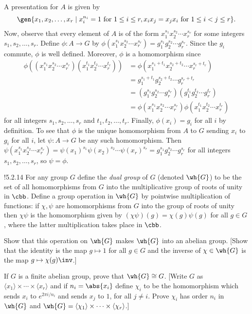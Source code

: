 \begin{sol}
    A presentation for $A$ is given by
    \[
    	\gen{x_1, x_2, \ldots, x_r \mid x_i^{n_i} = 1 \text{ for } 1 \leq i \leq r, x_ix_j = x_jx_i \text{ for } 1 \leq i < j \leq r}.
    \]
    Now, observe that every element of $A$ is of the form $x_1^{s_1} x_2^{s_2} \cdots x_r^{s_r}$ for some integers $s_1, s_2, \ldots, s_r$.
	Define $\phi \colon A \to G$ by $\phi(x_1^{s_1} x_2^{s_2} \cdots x_r^{s_r}) = g_1^{s_1} g_2^{s_2} \cdots g_r^{s_r}$.
	Since the $g_i$ commute, $\phi$ is well defined.
	Moreover, $\phi$ is a homomorphism since
    \begin{align*}
        \phi((x_1^{s_1} x_2^{s_2} \cdots x_r^{s_r})(x_1^{t_1} x_2^{t_2} \cdots x_r^{t_r})) & = \phi(x_1^{s_1 + t_1} x_2^{s_2 + t_2} \cdots x_r^{s_r + t_r}) \\
        & = g_1^{s_1 + t_1} g_2^{s_2 + t_2} \cdots g_r^{s_r + t_r} \\
        & = (g_1^{s_1} g_2^{s_2} \cdots g_r^{s_r})(g_1^{t_1} g_2^{t_2} \cdots g_r^{t_r}) \\
        & = \phi(x_1^{s_1} x_2^{s_2} \cdots x_r^{s_r})\phi(x_1^{t_1} x_2^{t_2} \cdots x_r^{t_r})
    \end{align*}
    for all integers $s_1, s_2, \ldots, s_r$ and $t_1, t_2, \ldots, t_r$.
	Finally, $\phi(x_i) = g_i$ for all $i$ by definition.
	To see that $\phi$ is the unique homomorphism from $A$ to $G$ sending $x_i$ to $g_i$ for all $i$, let $\psi \colon A \to G$ be any such homomorphism.
	Then $\psi(x_1^{s_1} x_2^{s_2} \cdots x_r^{s_r}) = \psi(x_1)^{s_1} \psi(x_2)^{s_2} \cdots \psi(x_r)^{s_r} = g_1^{s_1} g_2^{s_2} \cdots g_r^{s_r}$ for all integers $s_1, s_2, \ldots, s_r$, so $\psi = \phi$.
\end{sol}

\begin{exercise}!{5.2.14}
    For any group $G$ define the \emph{dual group} of $G$ (denoted $\wh{G}$) to be the set of all homomorphisms from $G$ into the multiplicative group of roots of unity in $\cbb$.
	Define a group operation in $\wh{G}$ by pointwise multiplication of functions: if $\chi, \psi$ are homomorphisms from $G$ into the group of roots of unity then $\chi\psi$ is the homomorphism given by $(\chi\psi)(g) = \chi(g)\psi(g)$ for all $g \in G$, where the latter multiplication takes place in $\cbb$.
    \begin{subexercises}
        \item Show that this operation on $\wh{G}$ makes $\wh{G}$ into an abelian group. [Show that the identity is the map $g \mapsto 1$ for all $g \in G$ and the inverse of $\chi \in \wh{G}$ is the map $g \mapsto \chi(g)\inv$.]
        \item If $G$ is a finite abelian group, prove that $\wh{G} \cong G$. [Write $G$ as $\langle x_1 \rangle \times \cdots \times \langle x_r \rangle$ and if $n_i = \abs{x_i}$ define $\chi_i$ to be the homomorphism which sends $x_i$ to $e^{2\pi i/n_i}$ and sends $x_j$ to $1$, for all $j \neq i$.
	Prove $\chi_i$ has order $n_i$ in $\wh{G}$ and $\wh{G} = \langle \chi_1 \rangle \times \cdots \times \langle \chi_r \rangle$.]
    \end{subexercises}
\end{exercise}

